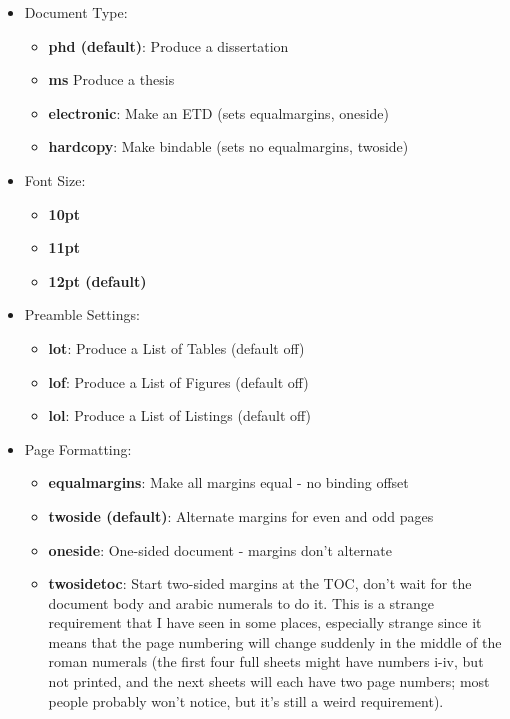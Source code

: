 \documentclass[phd,electronic,twosidetoc,letterpaper,chaptercenter,parttop,lol,lof,lot]{byumsphd}
\begin{document}
\begin{itemize}
    \item Document Type:
        \begin{itemize}
            \item \textbf{phd (default)}: Produce a dissertation
            \item \textbf{ms} Produce a thesis
            \item \textbf{electronic}: Make an ETD (sets equalmargins, oneside)
            \item \textbf{hardcopy}: Make bindable (sets no equalmargins, twoside)
        \end{itemize}
\pagebreak
    \item Font Size:
        \begin{itemize}
            \item \textbf{10pt}
            \item \textbf{11pt}
            \item \textbf{12pt (default)}
        \end{itemize}
    \item Preamble Settings:
        \begin{itemize}
            \item \textbf{lot}: Produce a List of Tables (default off)
            \item \textbf{lof}: Produce a List of Figures (default off)
            \item \textbf{lol}: Produce a List of Listings (default off)
        \end{itemize}
    \item Page Formatting:
        \begin{itemize}
            \item \textbf{equalmargins}: Make all margins equal - no binding offset
            \item \textbf{twoside (default)}: Alternate margins for even and odd pages
            \item \textbf{oneside}: One-sided document - margins don't alternate
            \item \textbf{twosidetoc}: Start two-sided margins at the TOC, don't wait for the document body and arabic numerals to do it.  This is a strange requirement that I have seen in some places, especially strange since it means that the page numbering will change suddenly in the middle of the roman numerals (the first four full sheets might have numbers i-iv, but not printed, and the next sheets will each have two page numbers; most people probably won't notice, but it's still a weird requirement).

\end{itemize}
\end{itemize}
\end{document}
